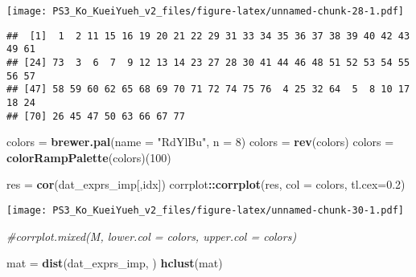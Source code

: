 \documentclass[]{article}
\newenvironment{Shaded}{\begin{snugshade}}{\end{snugshade}}
\newcommand{\KeywordTok}[1]{\textcolor[rgb]{0.13,0.29,0.53}{\textbf{#1}}}
\newcommand{\DataTypeTok}[1]{\textcolor[rgb]{0.13,0.29,0.53}{#1}}
\newcommand{\DecValTok}[1]{\textcolor[rgb]{0.00,0.00,0.81}{#1}}
\newcommand{\FloatTok}[1]{\textcolor[rgb]{0.00,0.00,0.81}{#1}}
\newcommand{\StringTok}[1]{\textcolor[rgb]{0.31,0.60,0.02}{#1}}
\newcommand{\CommentTok}[1]{\textcolor[rgb]{0.56,0.35,0.01}{\textit{#1}}}
\newcommand{\OperatorTok}[1]{\textcolor[rgb]{0.81,0.36,0.00}{\textbf{#1}}}
\newcommand{\NormalTok}[1]{#1}
\begin{document}
\texttt{[image: PS3\_Ko\_KueiYueh\_v2\_files/figure-latex/unnamed-chunk-28-1.pdf]}

\begin{Shaded}
\end{Shaded}

\begin{verbatim}
##  [1]  1  2 11 15 16 19 20 21 22 29 31 33 34 35 36 37 38 39 40 42 43 49 61
## [24] 73  3  6  7  9 12 13 14 23 27 28 30 41 44 46 48 51 52 53 54 55 56 57
## [47] 58 59 60 62 65 68 69 70 71 72 74 75 76  4 25 32 64  5  8 10 17 18 24
## [70] 26 45 47 50 63 66 67 77
\end{verbatim}

\begin{Shaded}
\begin{Highlighting}[]
\NormalTok{colors =}\StringTok{ }\KeywordTok{brewer.pal}\NormalTok{(}\DataTypeTok{name =} \StringTok{"RdYlBu"}\NormalTok{, }\DataTypeTok{n =} \DecValTok{8}\NormalTok{)}
\NormalTok{colors =}\StringTok{ }\KeywordTok{rev}\NormalTok{(colors)}
\NormalTok{colors =}\StringTok{ }\KeywordTok{colorRampPalette}\NormalTok{(colors)(}\DecValTok{100}\NormalTok{)}

\NormalTok{res =}\StringTok{ }\KeywordTok{cor}\NormalTok{(dat_exprs_imp[,idx])}
\NormalTok{corrplot}\OperatorTok{::}\KeywordTok{corrplot}\NormalTok{(res, }\DataTypeTok{col =}\NormalTok{ colors, }\DataTypeTok{tl.cex=}\FloatTok{0.2}\NormalTok{)}
\end{Highlighting}
\end{Shaded}

\texttt{[image: PS3\_Ko\_KueiYueh\_v2\_files/figure-latex/unnamed-chunk-30-1.pdf]}

\begin{Shaded}
\begin{Highlighting}[]
\CommentTok{#corrplot.mixed(M, lower.col = colors, upper.col = colors)}
\end{Highlighting}
\end{Shaded}

\begin{Shaded}
\begin{Highlighting}[]
\NormalTok{mat =}\StringTok{ }\KeywordTok{dist}\NormalTok{(dat_exprs_imp, )}
\KeywordTok{hclust}\NormalTok{(mat)}
\end{Highlighting}
\end{Shaded}
\end{document}
